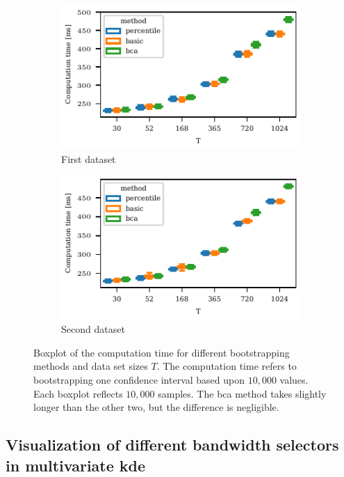 \documentclass[pdflatex]{sn-jnl}
\theoremstyle{plain}%
\theoremstyle{definition}
\begin{document}
\begin{figure}
    \centering
    \begin{subfigure}{0.48\textwidth}
\includegraphics{plots/illustrative_examples/boxplot_comp_time_butterfly}
        \caption{First dataset}
    \end{subfigure}
    \begin{subfigure}{0.48\textwidth}
    \includegraphics{plots/illustrative_examples/boxplot_comp_time_normal}
        \caption{Second dataset}
    \end{subfigure}
    \caption[Boxplot of the computation time for different bootstrapping methods and data set sizes.]{Boxplot of the computation time for different bootstrapping methods and data set sizes $T$. The computation time refers to bootstrapping one confidence interval based upon $10,000$ values. Each boxplot reflects $10,000$ samples. The \ac{bca} method takes slightly longer than the other two, but the difference is negligible.}
    \label{fig:atc_bootstrap_time}
\end{figure}


\subsection{Visualization of different bandwidth selectors in multivariate \ac{kde}}\label{subsec:appendix-kde}
\end{document}
